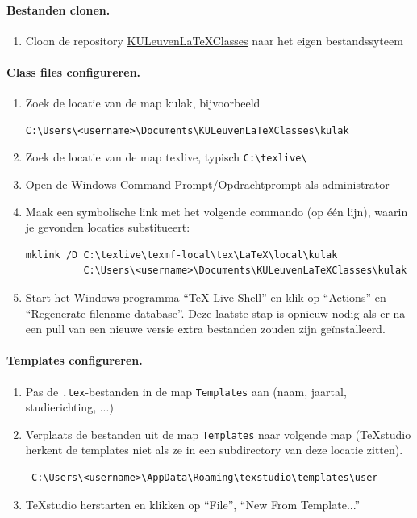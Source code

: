 \documentclass[kulak]{kulakarticle} %
\begin{document}
\paragraph{Bestanden clonen.}

\begin{enumerate}
	\item Cloon de repository \href{https://github.com/srebry/KULeuvenLaTeXClasses}{KULeuvenLaTeXClasses} naar het eigen bestandssyteem
\end{enumerate}

\paragraph{Class files configureren.}
\begin{enumerate}[resume]
	\item Zoek de locatie van de map kulak, bijvoorbeeld \begin{verbatim}
C:\Users\<username>\Documents\KULeuvenLaTeXClasses\kulak
\end{verbatim}
	\item Zoek de locatie van de map texlive, typisch \verb+C:\texlive\+
	\item Open de Windows Command Prompt/Opdrachtprompt als administrator
	\item Maak een symbolische link met het volgende commando (op één lijn), waarin je gevonden locaties substitueert:
	      \begin{verbatim}
mklink /D C:\texlive\texmf-local\tex\LaTeX\local\kulak
          C:\Users\<username>\Documents\KULeuvenLaTeXClasses\kulak
\end{verbatim}
	\item Start het Windows-programma ``TeX Live Shell'' en klik op ``Actions'' en ``Regenerate filename database''. Deze laatste stap is opnieuw nodig als er na een pull van een nieuwe versie extra bestanden zouden zijn geïnstalleerd.
\end{enumerate}

\paragraph{Templates configureren.}
\begin{enumerate}
	\item Pas de \texttt{.tex}-bestanden in de map \texttt{Templates} aan (naam, jaartal, studierichting, ...)
	\item Verplaats de bestanden uit de map \texttt{Templates} naar volgende map (TeXstudio herkent de templates niet als ze in een subdirectory van deze locatie zitten).
	      \begin{verbatim} C:\Users\<username>\AppData\Roaming\texstudio\templates\user\end{verbatim}
	\item TeXstudio herstarten en klikken op ``File'', ``New From Template...''
\end{enumerate}
\end{document}
